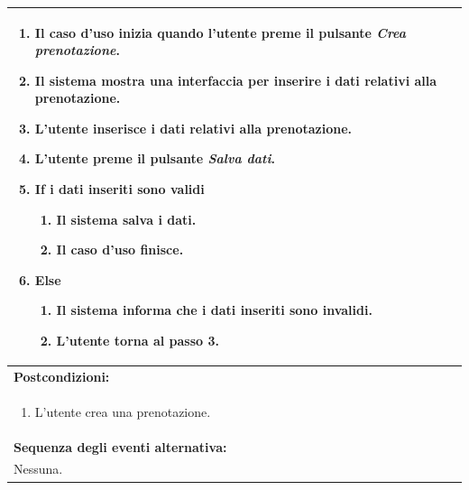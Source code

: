 \documentclass{article}
\begin{document}
\begin{table}[H]
\begin{tabular}{|p{\linewidth}|}
\begin{enumerate}
                            \item Il caso d'uso inizia quando l'utente preme il pulsante \emph{Crea prenotazione}.
                            \item Il sistema mostra una interfaccia per inserire i dati relativi alla prenotazione.
                            \item L'utente inserisce i dati relativi alla prenotazione.
                            \item L'utente preme il pulsante \emph{Salva dati}.
                            \item \textbf{If} i dati inseriti sono validi
                            \begin{enumerate}
                                \item Il sistema salva i dati.
                                \item Il caso d'uso finisce.
                            \end{enumerate}
                            \item \textbf{Else}
                            \begin{enumerate}
                                \item Il sistema informa che i dati inseriti sono invalidi.
                                \item L'utente torna al passo 3.
                            \end{enumerate}
                        \end{enumerate} \\
                        \hline
                        \cellcolor{gray!20}
                        \textbf{Postcondizioni:} \\
                        \cellcolor{gray!20}
                        \begin{minipage}{\linewidth}
                            \begin{enumerate}
                                \item L'utente crea una prenotazione.
                            \end{enumerate}
                        \end{minipage}
                        \vspace{-5pt} \\
                        \hline
                        \textbf{Sequenza degli eventi alternativa:} \\
                        Nessuna. \\
                        \hline
                    \end{tabular}
                \end{table}
\end{document}
